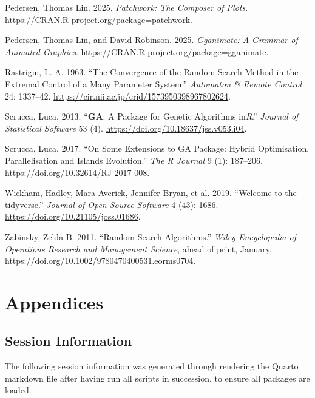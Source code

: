 \documentclass[
  a4paper,
]{article}
\newlength{\cslhangindent}
\newenvironment{CSLReferences}[2] %
 {\begin{list}{}{%
  \setlength{\itemindent}{0pt}
  \setlength{\leftmargin}{0pt}
  \setlength{\parsep}{0pt}
  \ifodd #1
   \setlength{\leftmargin}{\cslhangindent}
   \setlength{\itemindent}{-1\cslhangindent}
  \fi
  \setlength{\itemsep}{#2\baselineskip}}}
 {\end{list}}
\newcommand{\+}{\phantom{-}}
\begin{document}
\begin{CSLReferences}{1}{1}
Pedersen, Thomas Lin. 2025. \emph{Patchwork: The Composer of Plots}.
\url{https://CRAN.R-project.org/package=patchwork}.

Pedersen, Thomas Lin, and David Robinson. 2025. \emph{Gganimate: A
Grammar of Animated Graphics}.
\url{https://CRAN.R-project.org/package=gganimate}.

Rastrigin, L. A. 1963. {``The Convergence of the Random Search Method in
the Extremal Control of a Many Parameter System.''} \emph{Automaton \&
Remote Control} 24: 1337--42.
\url{https://cir.nii.ac.jp/crid/1573950398967802624}.

Scrucca, Luca. 2013. {``{\textbf{GA}}: A Package for Genetic Algorithms
in{\emph{R}}.''} \emph{Journal of Statistical Software} 53 (4).
\url{https://doi.org/10.18637/jss.v053.i04}.

Scrucca, Luca. 2017. {``On Some Extensions to {GA} Package: Hybrid
Optimisation, Parallelisation and Islands Evolution.''} \emph{The R
Journal} 9 (1): 187--206. \url{https://doi.org/10.32614/RJ-2017-008}.

Wickham, Hadley, Mara Averick, Jennifer Bryan, et al. 2019. {``Welcome
to the {tidyverse}.''} \emph{Journal of Open Source Software} 4 (43):
1686. \url{https://doi.org/10.21105/joss.01686}.

Zabinsky, Zelda B. 2011. {``Random Search Algorithms.''} \emph{Wiley
Encyclopedia of Operations Research and Management Science}, ahead of
print, January. \url{https://doi.org/10.1002/9780470400531.eorms0704}.

\end{CSLReferences}

\newpage

\section{Appendices}\label{appendices}

\subsection{Session Information}\label{session-information}

The following session information was generated through rendering the
Quarto markdown file after having run all scripts in succession, to
ensure all packages are loaded.
\end{document}
